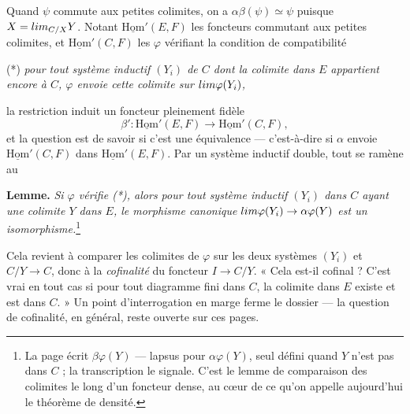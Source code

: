\documentclass[11pt,a4paper]{article}
\begin{document}
Quand $\psi$ commute aux petites colimites, on a
$\alpha\beta(\psi) \simeq \psi$ puisque $X = \varinjlim_{C/X} Y$. Notant
$\underline{\mathrm{Hom}}'(E, F)$ les foncteurs commutant aux petites
colimites, et $\underline{\mathrm{Hom}}'(C, F)$ les $\varphi$ vérifiant la
condition de compatibilité

(*) \emph{pour tout système inductif $(Y_i)$ de $C$ dont la colimite dans
$E$ appartient encore à $C$, $\varphi$ envoie cette colimite sur
$\varinjlim \varphi(Y_i)$,}

la restriction induit un foncteur pleinement fidèle
\[
\beta' : \underline{\mathrm{Hom}}'(E, F) \longrightarrow
\underline{\mathrm{Hom}}'(C, F),
\]
et la question est de savoir si c'est une équivalence — c'est-à-dire si
$\alpha$ envoie $\underline{\mathrm{Hom}}'(C, F)$ dans
$\underline{\mathrm{Hom}}'(E, F)$. Par un système inductif double, tout se
ramène au

\textbf{Lemme.} \emph{Si $\varphi$ vérifie (*), alors pour tout
système inductif $(Y_i)$ dans $C$ ayant une colimite $Y$ dans $E$, le
morphisme canonique $\varinjlim \varphi(Y_i) \to \alpha\varphi(Y)$ est un
isomorphisme.}\footnote{La page écrit $\beta\varphi(Y)$ — lapsus pour
$\alpha\varphi(Y)$, seul défini quand $Y$ n'est pas dans $C$ ; la
transcription le signale. C'est le lemme de comparaison des colimites le
long d'un foncteur dense, au cœur de ce qu'on appelle aujourd'hui le
théorème de densité.}

Cela revient à comparer les colimites de $\varphi$ sur les deux systèmes
$(Y_i)$ et $C/Y \to C$, donc à la \emph{cofinalité} du foncteur
$I \to C/Y$. « Cela est-il cofinal ? C'est vrai en tout cas si pour tout
diagramme fini dans $C$, la colimite dans $E$ existe et est dans $C$. » Un
point d'interrogation en marge ferme le dossier — la question de
cofinalité, en général, reste ouverte sur ces pages.
\end{document}
